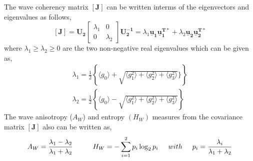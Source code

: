 The wave coherency matrix $\mathbf{[J]}$ can be written interms of the eigenvectors and eigenvalues as follows, 
\begin{equation}
\mathbf{[J]}=\bm{U_2}\left[\begin{array}{cc}
\lambda_1 & 0\\
0  & \lambda_2
\end{array}\right]
\bm{U_2^{-1}} =\lambda_1\bm{\underline{u}_1}\bm{\underline{u}_1^{T*}}+\lambda_2\bm{\underline{u}_2}\bm{\underline{u}_2^{T*}}
\end{equation}
where $\lambda_1 \ge \lambda_2 \ge 0$ are the two non-negative real eigenvalues which can be given as, 
\begin{equation}
\begin{split}
\lambda_1 = \frac{1}{2}\left\{\langle g_0\rangle+\sqrt{\langle g_1^2\rangle+\langle g_2^2\rangle+\langle g_3^2\rangle}\} \right\}\\
\lambda_2 = \frac{1}{2}\left \{\langle g_0\rangle-\sqrt{\langle g_1^2\rangle+\langle g_2^2\rangle+\langle g_3^2\rangle}\right\}
\end{split}
\end{equation}
The wave anisotropy ($A_W$) and entropy $(H_W)$ measures from the covariance matrix $\mathbf{[J]}$ also can be written as, 
\begin{equation}
A_W=\frac{\lambda_1-\lambda_2}{\lambda_1+\lambda_2} \hspace{1cm}
H_W= -\sum_{i=1}^{2}p_i\log_2p_i \hspace{0.5cm}with \hspace{0.5cm}
p_i=\frac{\lambda_i}{\lambda_1+\lambda_2}
\end{equation}  

